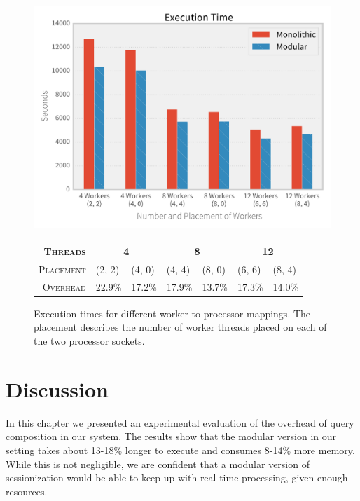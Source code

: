 \begin{figure}[h]
  \centering
    \includegraphics[width=1\textwidth]{figures/evaluation/numa}

    {\footnotesize
    \vspace{1em}
    \begin{tabularx}{\textwidth}{ r|XX|XX|XX }
      \hline 
      \textsc{Threads} & \multicolumn{2}{c|}{4} & \multicolumn{2}{c|}{8} & \multicolumn{2}{c}{12} \\
      \hline 
      \textsc{Placement} & (2, 2)&(4, 0)&(4, 4)&(8, 0)&(6, 6)&(8, 4)\\
      \hline 
      \textsc{Overhead} & 22.9\%&17.2\%&17.9\%&13.7\%&17.3\%&14.0\% \\
      \hline
    \end{tabularx}
    }
    \caption[Execution time for different of worker placement]{Execution times for
    different worker-to-processor mappings. The placement describes the number of
    worker threads placed on each of the two processor sockets.}
    \label{fig:numa}
\end{figure}

\clearpage
\section{Discussion}

In this chapter we presented an experimental evaluation of the overhead of
query composition in our system. The results show that the modular version in
our setting takes about 13-18\% longer to execute and consumes 8-14\% more
memory. While this is not negligible, we are confident that a modular version
of sessionization would be able to keep up with real-time processing, given
enough resources.

